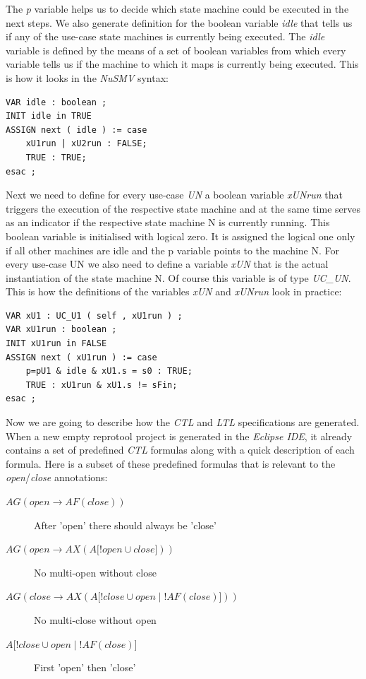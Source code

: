 The \emph{p} variable helps us to decide which state machine could be executed in the next steps. We also generate definition for the
boolean variable \emph{idle} that tells us if any of the use-case state machines is currently being executed. The \emph{idle} variable is defined
by the means of a set of boolean variables from which every variable tells us if the machine to which it maps is currently
being executed. This is how it looks in the \emph{NuSMV} syntax:
\begin{lstlisting}
VAR idle : boolean ;
INIT idle in TRUE
ASSIGN next ( idle ) := case
	xU1run | xU2run : FALSE;
	TRUE : TRUE;
esac ;
\end{lstlisting}

Next we need to define for every use-case \emph{UN} a boolean variable \emph{xUNrun} that triggers the execution of the respective state machine
and at the same time serves as an indicator if the respective state machine N is currently running. This boolean variable is
initialised with logical zero. It is assigned the logical one only if all other machines are idle and the p variable points to the
machine N. For every use-case UN we also need to define a variable \emph{xUN} that is the actual instantiation of the state machine N.
Of course this variable is of type \emph{UC\_UN}. This is how the definitions of the variables \emph{xUN} and \emph{xUNrun} look in practice:
\begin{lstlisting}
VAR xU1 : UC_U1 ( self , xU1run ) ;
VAR xU1run : boolean ;
INIT xU1run in FALSE
ASSIGN next ( xU1run ) := case
	p=pU1 & idle & xU1.s = s0 : TRUE;
	TRUE : xU1run & xU1.s != sFin;
esac ;
\end{lstlisting}

Now we are going to describe how the \emph{CTL} and \emph{LTL} specifications are generated. When a new empty reprotool project is generated in the
\emph{Eclipse IDE}, it already contains a set of predefined \emph{CTL} formulas along with a quick description of each formula. Here is a subset of
these predefined formulas that is relevant to the \emph{open}/\emph{close} annotations:

\begin{description}
 \item[$AG(open \rightarrow AF(close))$] After 'open' there should always be 'close'
 \item[$AG(open \rightarrow AX(A\lbrack!open \cup close\rbrack))$] No multi-open without close
 \item[$AG(close \rightarrow AX(A\lbrack!close \cup open \mid !AF(close) \rbrack))$] No multi-close without open
 \item[$A\lbrack !close \cup open \mid !AF(close)\rbrack$] First 'open' then 'close'
\end{description}

